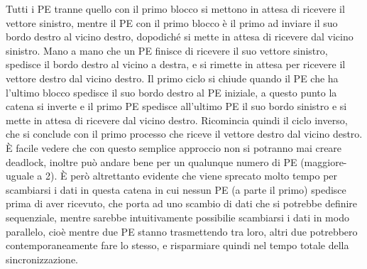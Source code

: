 Tutti i PE tranne quello con il primo blocco si mettono in attesa di ricevere il vettore sinistro, mentre il PE con il primo blocco \`e il primo ad inviare il suo bordo destro al vicino destro, dopodich\'e si mette in attesa di ricevere dal vicino sinistro. Mano a mano che un PE finisce di ricevere il suo vettore sinistro, spedisce il bordo destro al vicino a destra, e si rimette in attesa per ricevere il vettore destro dal vicino destro. Il primo ciclo si chiude quando il PE che ha l'ultimo blocco spedisce il suo bordo destro al PE iniziale, a questo punto la catena si inverte e il primo PE spedisce all'ultimo PE il suo bordo sinistro e si mette in attesa di ricevere dal vicino destro. Ricomincia quindi il ciclo inverso, che si conclude con il primo processo che riceve il vettore destro dal vicino destro. \`E facile vedere che con questo semplice approccio non si potranno mai creare deadlock, inoltre pu\`o andare bene per un qualunque numero di PE (maggiore-uguale a 2). \`E per\`o altrettanto evidente che viene sprecato molto tempo per scambiarsi i dati in questa catena in cui nessun PE (a parte il primo) spedisce prima di aver ricevuto, che porta ad uno scambio di dati che si potrebbe definire sequenziale, mentre sarebbe intuitivamente possibilie scambiarsi i dati in modo parallelo, cio\`e mentre due PE stanno trasmettendo tra loro, altri due potrebbero contemporaneamente fare lo stesso, e risparmiare quindi nel tempo totale della sincronizzazione.

